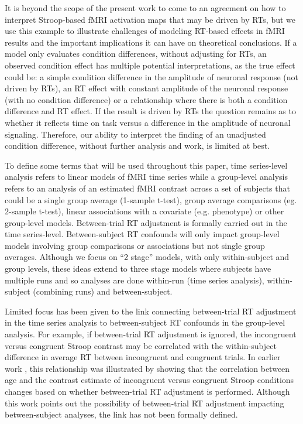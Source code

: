 \documentclass[titlepage,12pt] {article}
\begin{document}
It is beyond the scope of the present work to come to an agreement on how to interpret Stroop-based fMRI activation maps that may be driven by RTs, but we use this example to illustrate challenges of modeling RT-based effects in fMRI results and the important implications it can have on theoretical conclusions. If a model only evaluates condition differences, without adjusting for RTs, an observed condition effect has multiple potential interpretations, as the true effect could be: a simple condition difference in the amplitude of neuronal response (not driven by RTs), an RT effect with constant amplitude of the neuronal response (with no condition difference) or a relationship where there is both a condition difference and RT effect. If the result is driven by RTs the question remains as to whether it reflects time on task versus a difference in the amplitude of neuronal signaling. Therefore, our ability to interpret the finding of an unadjusted condition difference, without further analysis and work, is limited at best.

To define some terms that will be used throughout this paper, time series-level analysis refers to linear models of fMRI time series while a group-level analysis refers to an analysis of an estimated fMRI contrast across a set of subjects that could be a single group average (1-sample t-test), group average comparisons (eg. 2-sample t-test), linear associations with a covariate (e.g. phenotype) or other group-level models.   Between-trial RT adjustment is formally carried out in the time series-level. Between-subject RT confounds will only impact group-level models involving group comparisons or associations but not single group averages.  Although we focus on ``2 stage'' models, with only within-subject and group levels, these ideas extend to three stage models where subjects have multiple runs and so analyses are done within-run (time series analysis), within-subject (combining runs) and between-subject.


Limited focus has been given to the link connecting between-trial RT adjustment in the time series analysis to between-subject RT confounds in the group-level analysis. For example, if between-trial RT adjustment is ignored, the incongruent versus congruent Stroop contrast may be  correlated with the within-subject difference in average RT between incongruent and congruent trials.  In earlier work \citep{carpRemovingEffectResponse2012}, this relationship was illustrated by showing that the correlation between age and the contrast estimate of incongruent versus congruent Stroop conditions changes based on whether between-trial RT adjustment is performed. Although this work points out the possibility of between-trial RT adjustment impacting between-subject analyses, the link has not been formally defined.
 
\end{document}
